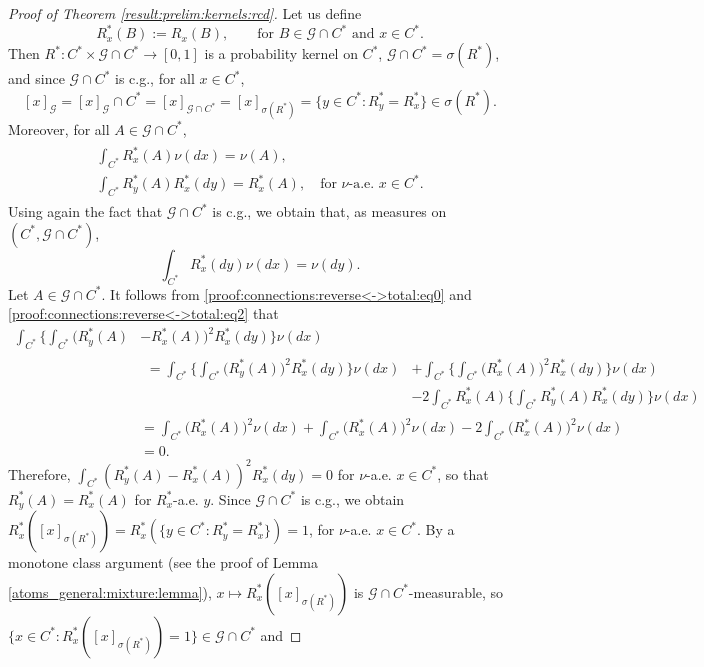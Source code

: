 \documentclass[a4paper]{article}
\theoremstyle{plain}
\theoremstyle{remark}
\theoremstyle{definition}
\begin{document}
\begin{proof}[Proof of Theorem \ref{result:prelim:kernels:rcd}]
Let us define
\[R^*_x(B):=R_x(B),\qquad\mbox{for }B\in\mathcal{G}\cap C^*\mbox{ and }x\in C^*.\]
Then $R^*:C^*\times\mathcal{G}\cap C^*\rightarrow[0,1]$ is a probability kernel on $C^*$, $\mathcal{G}\cap C^*=\sigma(R^*)$, and since $\mathcal{G}\cap C^*$ is c.g., for all $x\in C^*$,
\[[x]_\mathcal{G}=[x]_\mathcal{G}\cap C^*=[x]_{\mathcal{G}\cap C^*}=[x]_{\sigma(R^*)}=\{y\in C^*:R^*_y=R_x^*\}\in\sigma(R^*).\]
Moreover, for all $A\in\mathcal{G}\cap C^*$,
\begingroup\allowdisplaybreaks
\begin{gather}\label{proof:connections:reverse<->total:eq0}
\begin{gathered}
\int_{C^*}R^*_x(A)\nu(dx)=\nu(A),\\
\int_{C^*}R_y^*(A)R_x^*(dy)=R_x^*(A),\quad\mbox{for }\nu\mbox{-a.e. }x\in C^*.
\end{gathered}
\end{gather}
\endgroup
Using again the fact that $\mathcal{G}\cap C^*$ is c.g., we obtain that, as measures on $(C^*,\mathcal{G}\cap C^*)$,
\begin{equation}\label{proof:connections:reverse<->total:eq2}
\int_{C^*}R_x^*(dy)\nu(dx)=\nu(dy).
\end{equation}
Let $A\in\mathcal{G}\cap C^*$. It follows from \eqref{proof:connections:reverse<->total:eq0} and \eqref{proof:connections:reverse<->total:eq2} that
\begingroup\allowdisplaybreaks
\begin{align*}
\int_{C^*}\biggl\{\int_{C^*}\bigl(R_y^*(A)&-R_x^*(A)\bigr)^2R_x^*(dy)\biggr\}\nu(dx)\\
&\begin{aligned}=\int_{C^*}\biggl\{\int_{C^*}\bigl(R_y^*(A)\bigr)^2R_x^*(dy)\biggr\}\nu(dx)&+\int_{C^*}\biggl\{\int_{C^*}\bigl(R_x^*(A)\bigr)^2R_x^*(dy)\biggr\}\nu(dx)\\
&-2\int_{C^*}R_x^*(A)\biggl\{\int_{C^*}R_y^*(A)R_x^*(dy)\biggr\}\nu(dx)\end{aligned}\\
&=\int_{C^*}\bigl(R_x^*(A)\bigr)^2\nu(dx)+\int_{C^*}\bigl(R_x^*(A)\bigr)^2\nu(dx)-2\int_{C^*}\bigl(R_x^*(A)\bigr)^2\nu(dx)\\
&=0.
\end{align*}
\endgroup
Therefore, $\int_{C^*}(R_y^*(A)-R_x^*(A))^2R_x^*(dy)=0$ for $\nu$-a.e. $x\in C^*$, so that $R_y^*(A)=R_x^*(A)$ for $R_x^*$-a.e. $y$. Since $\mathcal{G}\cap C^*$ is c.g., we obtain $R_x^*([x]_{\sigma(R^*)})=R_x^*(\{y\in C^*:R_y^*=R_x^*\})=1$, for $\nu$-a.e. $x\in C^*$. By a monotone class argument (see the proof of Lemma \ref{atoms_general:mixture:lemma}), $x\mapsto R_x^*([x]_{\sigma(R^*)})$ is $\mathcal{G}\cap C^*$-measurable, so $\{x\in C^*:R_x^*([x]_{\sigma(R^*)})=1\}\in\mathcal{G}\cap C^*$ and

\end{proof}
\end{document}
